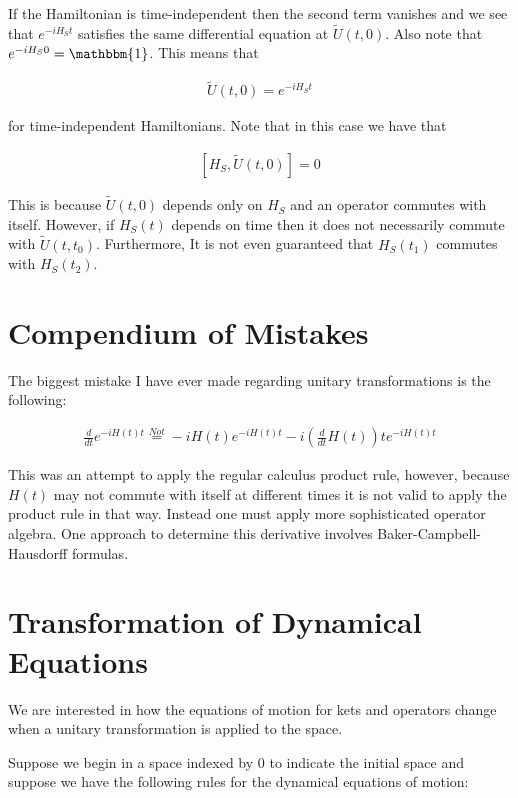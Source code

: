 \documentclass[12pt]{article}
\begin{document}
If the Hamiltonian is time-independent then the second term vanishes and we see that $e^{-iH_S t}$ satisfies the same differential equation at $\tilde{U}(t,0)$. Also note that $e^{-iH_S 0} = \mathbbm{1}$. This means that

\begin{align}
\tilde{U}(t,0) = e^{-iH_S t}
\end{align}

for time-independent Hamiltonians.
Note that in this case we have that 

\begin{align}
\left[H_S,\tilde{U}(t,0)\right] = 0
\end{align}

This is because $\tilde{U}(t,0)$ depends only on $H_S$ and an operator commutes with itself. However, if $H_S(t)$ depends on time then it does not necessarily commute with $\tilde{U}(t,t_0)$. Furthermore, It is not even guaranteed that $H_S(t_1)$ commutes with $H_S(t_2)$.


\section{Compendium of Mistakes}

The biggest mistake I have ever made regarding unitary transformations is the following:

\begin{align}
\frac{d}{dt} e^{-iH(t) t} \stackrel{Not}{=} -iH(t) e^{-iH(t)t} -i \left(\frac{d}{d t} H(t)\right) t e^{-iH(t)t}
\end{align}

This was an attempt to apply the regular calculus product rule, however, because $H(t)$ may not commute with itself at different times it is not valid to apply the product rule in that way. Instead one must apply more sophisticated operator algebra. One approach to determine this derivative involves Baker-Campbell-Hausdorff formulas.




\section{Transformation of Dynamical Equations}

We are interested in how the equations of motion for kets and operators change when a unitary transformation is applied to the space. 

Suppose we begin in a space indexed by $0$ to indicate the initial space and suppose we have the following rules for the dynamical equations of motion:
\end{document}
